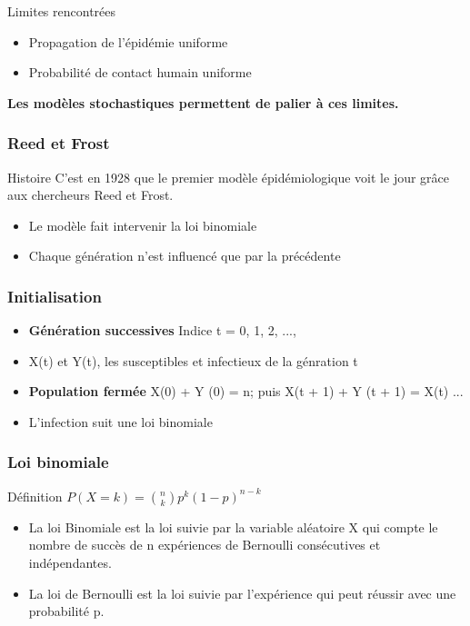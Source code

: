 \begin{frame}
    \begin{block}{Limites rencontrées}
        \begin{itemize}
            \item Propagation de l'épidémie uniforme
            \item Probabilité de contact humain uniforme
        \end{itemize}
    \end{block}

    \begin{center}
        \bf Les modèles stochastiques permettent de palier à ces limites.
    \end{center}
\end{frame}


\begin{frame}
    \frametitle{Reed et Frost}

    \begin{block}{Histoire}
        C'est en 1928 que le premier modèle épidémiologique voit le jour grâce aux chercheurs Reed et Frost.
    \end{block}

    \begin{itemize}
        \item Le modèle fait intervenir la loi binomiale
        \item Chaque génération n'est influencé que par la précédente
    \end{itemize}
\end{frame}


\begin{frame}
	\frametitle{Initialisation}
	\begin{itemize}
	\item \textbf{Génération successives} Indice t =  0, 1, 2, ...,
	\item X(t) et Y(t), les susceptibles et infectieux de la génration t
	\item \textbf{Population fermée} X(0) + Y (0) = n; puis X(t + 1) + Y (t + 1) = X(t) ...
	\item L'infection suit une loi binomiale
	\end{itemize}
\end{frame}


\begin{frame}
    \frametitle{Loi binomiale}

    \begin{alertblock}{Définition}
        $ P(X = k) = \binom{n}{k}p^k(1 - p)^{n-k} $
    \end{alertblock}

    \begin{itemize}
        \item La loi Binomiale est la loi suivie par la variable aléatoire X qui compte le nombre de succès de n expériences de Bernoulli consécutives et indépendantes.
        \item La loi de Bernoulli est la loi suivie par l'expérience qui peut réussir avec une probabilité p.
    \end{itemize}
\end{frame}


